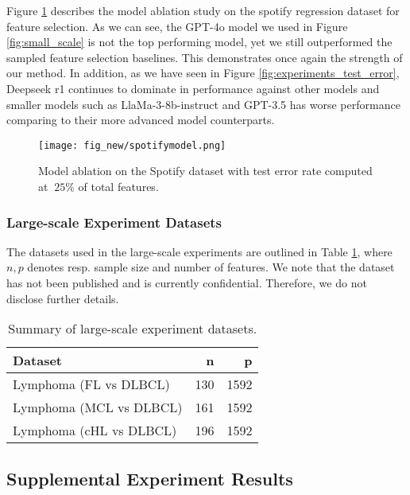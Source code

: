 Figure \ref{fig:spotify} describes the model ablation study on the spotify regression dataset for feature selection. As we can see, the GPT-4o model we used in Figure \ref{fig:small_scale} is not the top performing model, yet we still outperformed the sampled feature selection baselines. This demonstrates once again the strength of our method. In addition, as we have seen in Figure \ref{fig:experiments_test_error}, Deepseek r1 continues to dominate in performance against other models and smaller models such as LlaMa-3-8b-instruct and GPT-3.5 has worse performance comparing to their more advanced model counterparts.

\begin{figure}[h]
    \centering    \texttt{[image: fig\_new/spotifymodel.png]}
    \caption{Model ablation on the Spotify dataset with test error rate computed at $~25\%$ of total features.}
    \label{fig:spotify}
\end{figure}

\subsubsection{Large-scale Experiment Datasets}\label{subsec:large_scale_data}
The datasets used in the large-scale experiments are outlined in Table \ref{tab:data}, where $n,p$ denotes resp. sample size and number of features. We note that the dataset has not been published and is currently confidential. Therefore, we do not disclose further details. 

\begin{table}[h!]
\small
\centering
\begin{tabular}{lrr}
\toprule
\textbf{Dataset} & \textbf{n} & \textbf{p} \\
\midrule
Lymphoma (FL vs DLBCL) & 130 & 1592 \\ Lymphoma (MCL vs DLBCL) & 161 & 1592 \\ Lymphoma (cHL vs DLBCL) & 196 & 1592 \\
\bottomrule
\end{tabular}
\caption{Summary of large-scale experiment datasets.}
\label{tab:data}
\end{table}

\subsection{Supplemental Experiment Results}


